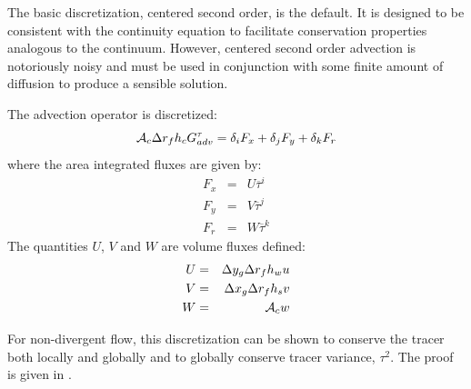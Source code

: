 The basic discretization, centered second order, is the default. It is
designed to be consistent with the continuity equation to facilitate
conservation properties analogous to the continuum. However, centered
second order advection is notoriously noisy and must be used in
conjunction with some finite amount of diffusion to produce a sensible
solution.

The advection operator is discretized:
\begin{equation}
{\cal A}_c \Delta r_f h_c G_{adv}^\tau = 
\delta_i F_x + \delta_j F_y + \delta_k F_r
\end{equation}
where the area integrated fluxes are given by:
\begin{eqnarray}
F_x & = & U \overline{ \tau }^i \\
F_y & = & V \overline{ \tau }^j \\
F_r & = & W \overline{ \tau }^k
\end{eqnarray}
The quantities $U$, $V$ and $W$ are volume fluxes defined:
\begin{eqnarray}
U & = & \Delta y_g \Delta r_f h_w u \\
V & = & \Delta x_g \Delta r_f h_s v \\
W & = & {\cal A}_c w
\end{eqnarray}

For non-divergent flow, this discretization can be shown to conserve
the tracer both locally and globally and to globally conserve tracer
variance, $\tau^2$. The proof is given in \cite{adcroft:95,adcroft:97}.



